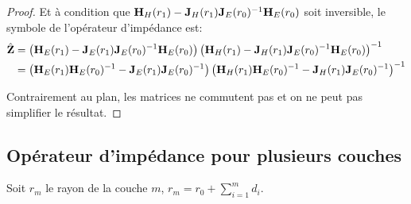 \begin{proof}
            Et à condition que $\mH_{H}(r_1) - \mJ_{H}(r_1)\mJ_{E}(r_0)^{-1}\mH_{E}(r_0)$ soit inversible, le symbole de l'opérateur d'impédance est:
            \begin{align}
                \hat \mZ &= 
                \left(\mH_{E}(r_1) - \mJ_{E}(r_1)\mJ_{E}(r_0)^{-1}\mH_{E}(r_0)\right)
                \left(\mH_{H}(r_1) - \mJ_{H}(r_1)\mJ_{E}(r_0)^{-1}\mH_{E}(r_0)\right)^{-1}
                \\
                &=
                \left(\mH_{E}(r_1)\mH_{E}(r_0)^{-1} - \mJ_{E}(r_1)\mJ_{E}(r_0)^{-1}\right)
                \left(\mH_{H}(r_1)\mH_{E}(r_0)^{-1} - \mJ_{H}(r_1)\mJ_{E}(r_0)^{-1}\right)^{-1}
            \end{align}

            Contrairement au plan, les matrices ne commutent pas et on ne peut pas simplifier le résultat.

        \end{proof}



    \subsection{Opérateur d'impédance pour plusieurs couches}

        \begin{figure}[!hbt]
            \centering
            \begin{tikzpicture}
                
            \end{tikzpicture}
        \end{figure}

        Soit $r_m$ le rayon de la couche $m$, $r_m = r_0 +\sum_{i=1}^{m} d_{i}$. 


